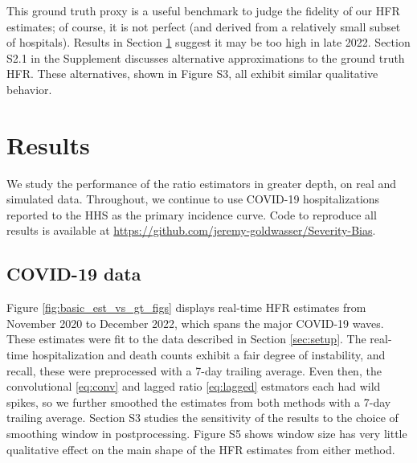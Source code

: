 \documentclass{article}
\begin{document}
This ground truth proxy is a useful benchmark to judge the fidelity of our HFR
estimates; of course, it is not perfect (and derived from a relatively small
subset of hospitals). Results in Section \ref{sec:results} suggest it may be too
high in late 2022. 
Section S2.1 in the Supplement discusses alternative
approximations to the ground truth HFR. 
These alternatives, shown in Figure S3, all exhibit similar qualitative behavior. 

\section{Results}
\label{sec:results}

We study the performance of the ratio estimators in greater depth, on real and 
simulated data. Throughout, we continue to use COVID-19 hospitalizations
reported to the HHS as the primary incidence curve. Code to reproduce all
results is available at
\url{https://github.com/jeremy-goldwasser/Severity-Bias}.            

\subsection{COVID-19 data}
\label{sec:results_real}

Figure \ref{fig:basic_est_vs_gt_figs} displays real-time HFR estimates from
November 2020 to December 2022, which spans the major COVID-19 waves. These
estimates were fit to the data described in Section \ref{sec:setup}. The
real-time hospitalization and death counts exhibit a fair degree of instability,
and recall, these were preprocessed with a 7-day trailing average. Even then,
the convolutional \eqref{eq:conv} and lagged ratio \eqref{eq:lagged} estmators
each had wild spikes, so we further smoothed the estimates from both methods
with a 7-day trailing average. 
Section S3 studies the
sensitivity of the results to the choice of smoothing window in postprocessing.
Figure S5 shows window size has very little qualitative effect on the main shape of the HFR estimates from either method. 
\end{document}
